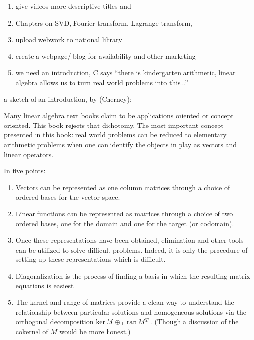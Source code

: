 \documentclass[12pt]{article}
\begin{document}
\begin{enumerate}
\item give videos more descriptive titles and 

\item Chapters on SVD, Fourier transform, Lagrange transform, 

\item upload webwork to national library

\item create a webpage/ blog for availability and other marketing 

\item we need an introduction, C says ``there is kindergarten arithmetic,
linear algebra allows us to turn real world problems into this...''

\end{enumerate}


a sketch of an introduction, by (Cherney): 

Many linear algebra text books claim to be applications oriented or concept oriented. This book rejects that dichotomy. 
The most important concept presented in this book: real world problems can be reduced to elementary arithmetic problems when one can identify the objects in play as vectors and linear operators. 

In five points: 
\begin{enumerate}
\item Vectors can be represented as one column matrices through a choice of ordered bases for the vector space.
\item Linear functions can be represented as matrices through a choice of two ordered bases, one for the domain and one for the target (or codomain).
\item Once these representations have been obtained, elimination and other tools can be utilized to solve difficult problems. Indeed, it is only the procedure of setting up these representations which is difficult. 
\item Diagonalization is the process of finding a basis in which the resulting matrix equations is easiest. 
\item The kernel and range of matrices provide a clean way to understand the relationship between particular solutions and homogeneous solutions via the orthogonal decomposition 
$\ker M \oplus_\perp {\rm ran}\, M^T$. (Though a discussion of the cokernel of $M$ would be more honest.)
\end{enumerate}
\end{document}
